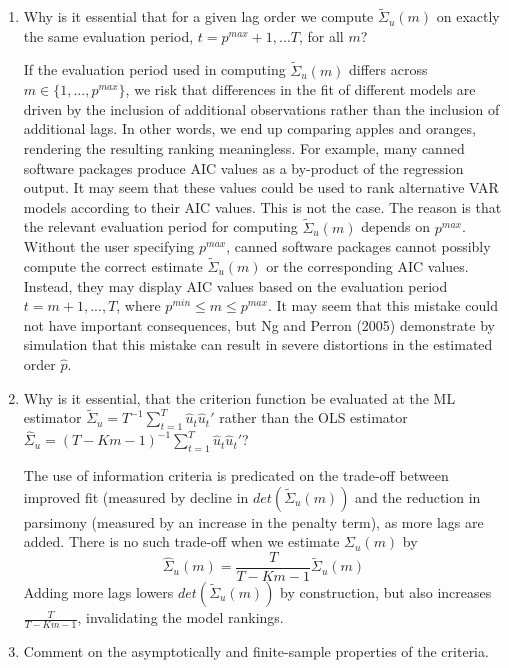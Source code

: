 \documentclass[a4paper]{scrartcl}
\begin{document}
\begin{enumerate}
	\item Why is it essential that for a given lag order we compute $\tilde{\Sigma}_u(m)$ on exactly the same evaluation period, $t=p^{max}+1,...T$, for all $m$?
	\begin{solution}
		If the evaluation period used in computing $\tilde{\Sigma}_u(m)$ differs across $m \in \{1,...,p^{max}\}$, we risk that differences in the fit of different models are driven by the inclusion of additional observations rather than the inclusion of additional lags. In other words, we end up comparing apples and oranges, rendering the resulting ranking meaningless. For example, many canned software packages produce AIC values as a by-product of the regression output. It may seem that these values could be used to rank alternative VAR models according to their AIC values. This is not the case. The reason is that the relevant evaluation period for computing $\tilde{\Sigma}_u(m)$ depends on $p^{max}$. Without the user specifying $p^{max}$, canned software packages cannot possibly compute the correct estimate $\tilde{\Sigma}_u(m)$ or the corresponding AIC values. Instead, they may display AIC values based on the evaluation period $t = m + 1,..., T$, where $p^{min} \leq m \leq p^{max}$. It may seem that this mistake could not have important consequences, but Ng and Perron (2005) demonstrate by simulation that this mistake can result in severe distortions in the estimated order $\hat{p}$.
	\end{solution}
	\item Why is it essential, that the criterion function be evaluated at the ML estimator $\tilde{\Sigma}_u=T^{-1}\sum_{t=1}^T \hat{u}_t\hat{u}_t'$ rather than the OLS estimator $\hat{\Sigma}_u=(T-Km-1)^{-1}\sum_{t=1}^T \hat{u}_t\hat{u}_t'$?
	\begin{solution}
	The use of information criteria is predicated on the trade-off between improved fit (measured by decline in $det(\tilde{\Sigma}_u(m))$ and the reduction in parsimony (measured by an increase in the penalty term), as more lags are added. There is no such trade-off when we estimate $\Sigma_u(m)$ by 
	$$\hat{\Sigma}_u(m) = \frac{T}{T-Km-1}\tilde{\Sigma}_u(m)$$
	Adding more lags lowers	$det(\tilde{\Sigma}_u(m))$ by construction, but also increases $\frac{T}{T-Km-1}$, invalidating the model rankings.
	\end{solution}
	\item Comment on the asymptotically and finite-sample properties of the criteria.
	\begin{solution}

\end{solution}
\end{enumerate}
\end{document}
